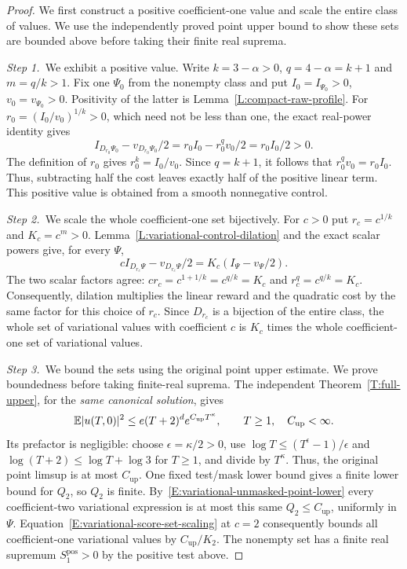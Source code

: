 \begin{proof}
  We first construct a positive coefficient-one value and scale the entire
  class of values. We use the independently proved point upper bound to show
  these sets are bounded above before taking their finite real suprema.


  \medskip
  \noindent\textit{Step 1.~}We exhibit a positive value.
  Write $k = 3-\alpha > 0$, $q = 4-\alpha = k+1$ and $m = q/k > 1$. Fix one
  $\Psi_0$ from the nonempty class and put $I_0 = I_{\Psi_0} > 0$, $v_0 =
  v_{\Psi_0} > 0$. Positivity of the latter is
  Lemma~\ref{L:compact-raw-profile}. For $r_0 = (I_0/v_0)^{1/k} > 0$, which need
  not be less than one, the exact real-power identity gives
  \[
    I_{D_{r_0}\Psi_0}-v_{D_{r_0}\Psi_0}/2
    =r_0I_0-r_0^qv_0/2=r_0I_0/2>0.
  \]
  The definition of $r_0$ gives $r_0^k=I_0/v_0$. Since $q=k+1$, it follows
  that $r_0^qv_0=r_0I_0$. Thus, subtracting half the cost leaves exactly half
  of the positive linear term.
  This positive value is obtained from a smooth nonnegative control.


  \medskip
  \noindent\textit{Step 2.~}We scale the whole coefficient-one set
  bijectively.
  For $c > 0$ put $r_c = c^{1/k}$ and $K_c = c^m > 0$.
  Lemma~\ref{L:variational-control-dilation} and the exact scalar powers give,
  for every $\Psi$,
  \begin{equation}\label{E:variational-score-set-scaling}
    cI_{D_{r_c}\Psi}-v_{D_{r_c}\Psi}/2
    =K_c(I_\Psi-v_\Psi/2).
  \end{equation}
  The two scalar factors agree: $cr_c=c^{1+1/k}=c^{q/k}=K_c$ and
  $r_c^q=c^{q/k}=K_c$. Consequently, dilation multiplies the linear reward and
  the quadratic cost by the same factor for this choice of $r_c$.
  Since $D_{r_c}$ is a bijection of the entire class, the whole set of
  variational values with coefficient $c$ is $K_c$ times the whole
  coefficient-one set of variational values.


  \medskip
  \noindent\textit{Step 3.~}We bound the sets using the original point upper
  estimate.
  We prove boundedness before taking finite-real suprema. The independent
  Theorem~\ref{T:full-upper}, for the \emph{same canonical solution}, gives
  \[
    \mathbb{E}|u(T,0)|^2\le e(T+2)^d e^{C_{\mathrm{up}}T^\kappa},
    \qquad T\ge1,\quad C_{\mathrm{up}}<\infty.
  \]
  Its prefactor is negligible: choose $\epsilon = \kappa/2 > 0$, use $\log T \le
  (T^\epsilon-1)/\epsilon$ and $\log(T+2) \le \log T+\log3$ for $T \ge 1$, and
  divide by $T^\kappa$. Thus, the original point limsup is at most
  $C_{\mathrm{up}}$. One fixed test/mask lower bound gives a finite lower bound
  for $Q_2$, so $Q_2$ is finite. By~\eqref{E:variational-unmasked-point-lower}
  every coefficient-two variational expression is at most this same $Q_2 \le
  C_{\mathrm{up}}$, uniformly in $\Psi$.
  Equation~\eqref{E:variational-score-set-scaling} at $c = 2$ consequently
  bounds all coefficient-one variational values by $C_{\mathrm{up}}/K_2$. The
  nonempty set has a finite real supremum $S_1^{\mathrm{pos}} > 0$ by the
  positive test above.



\end{proof}

